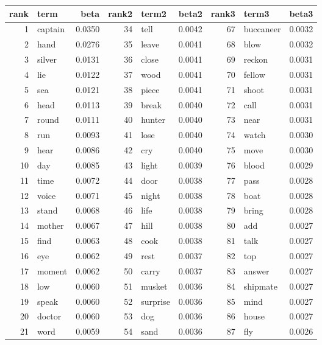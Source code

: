 \begin{table}[ht]
\centering
\begin{tabular}{rlrrlrrlr}
  \hline
rank & term & beta & rank2 & term2 & beta2 & rank3 & term3 & beta3 \\ 
  \hline
1 & captain & 0.0350 & 34 & tell & 0.0042 & 67 & buccaneer & 0.0032 \\ 
  2 & hand & 0.0276 & 35 & leave & 0.0041 & 68 & blow & 0.0032 \\ 
  3 & silver & 0.0131 & 36 & close & 0.0041 & 69 & reckon & 0.0031 \\ 
  4 & lie & 0.0122 & 37 & wood & 0.0041 & 70 & fellow & 0.0031 \\ 
  5 & sea & 0.0121 & 38 & piece & 0.0041 & 71 & shoot & 0.0031 \\ 
  6 & head & 0.0113 & 39 & break & 0.0040 & 72 & call & 0.0031 \\ 
  7 & round & 0.0111 & 40 & hunter & 0.0040 & 73 & near & 0.0031 \\ 
  8 & run & 0.0093 & 41 & lose & 0.0040 & 74 & watch & 0.0030 \\ 
  9 & hear & 0.0086 & 42 & cry & 0.0040 & 75 & move & 0.0030 \\ 
  10 & day & 0.0085 & 43 & light & 0.0039 & 76 & blood & 0.0029 \\ 
  11 & time & 0.0072 & 44 & door & 0.0038 & 77 & pass & 0.0028 \\ 
  12 & voice & 0.0071 & 45 & night & 0.0038 & 78 & boat & 0.0028 \\ 
  13 & stand & 0.0068 & 46 & life & 0.0038 & 79 & bring & 0.0028 \\ 
  14 & mother & 0.0067 & 47 & hill & 0.0038 & 80 & add & 0.0027 \\ 
  15 & find & 0.0063 & 48 & cook & 0.0038 & 81 & talk & 0.0027 \\ 
  16 & eye & 0.0062 & 49 & rest & 0.0037 & 82 & top & 0.0027 \\ 
  17 & moment & 0.0062 & 50 & carry & 0.0037 & 83 & answer & 0.0027 \\ 
  18 & low & 0.0060 & 51 & musket & 0.0036 & 84 & shipmate & 0.0027 \\ 
  19 & speak & 0.0060 & 52 & surprise & 0.0036 & 85 & mind & 0.0027 \\ 
  20 & doctor & 0.0060 & 53 & dog & 0.0036 & 86 & house & 0.0027 \\ 
  21 & word & 0.0059 & 54 & sand & 0.0036 & 87 & fly & 0.0026 \\ 

\end{tabular}
\end{table}
